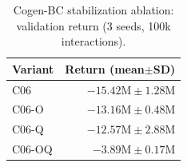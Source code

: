 \begin{table}[t]\centering\small\caption{Cogen-BC stabilization ablation: validation return (3 seeds, 100k interactions).}\label{tab:cogenabl}\begin{tabular}{lr}\toprule Variant & Return (mean$\pm$SD)\\\midrule C06 & $-15.42\mathrm{M}\pm1.28\mathrm{M}$\\ C06-O & $-13.16\mathrm{M}\pm0.48\mathrm{M}$\\ C06-Q & $-12.57\mathrm{M}\pm2.88\mathrm{M}$\\ C06-OQ & $-3.89\mathrm{M}\pm0.17\mathrm{M}$\\\bottomrule\end{tabular}\end{table}
